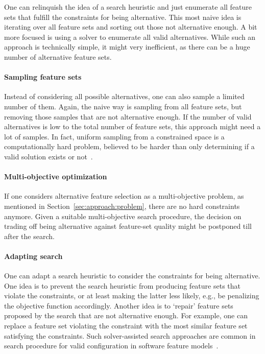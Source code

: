 \documentclass{article}
\theoremstyle{definition}
\begin{document}
One can relinquish the idea of a search heuristic and just enumerate all feature sets that fulfill the constraints for being alternative.
This most naive idea is iterating over all feature sets and sorting out those not alternative enough.
A bit more focused is using a solver to enumerate all valid alternatives.
While such an approach is technically simple, it might very inefficient, as there can be a huge number of alternative feature sets.

\paragraph{Sampling feature sets}

Instead of considering all possible alternatives, one can also sample a limited number of them.
Again, the naive way is sampling from all feature sets, but removing those samples that are not alternative enough.
If the number of valid alternatives is low to the total number of feature sets, this approach might need a lot of samples.
In fact, uniform sampling from a constrained space is a computationally hard problem, believed to be harder than only determining if a valid solution exists or not~\cite{ermon2012uniform}.

\paragraph{Multi-objective optimization}

If one considers alternative feature selection as a multi-objective problem, as mentioned in Section~\ref{sec:approach:problem}, there are no hard constraints anymore.
Given a suitable multi-objective search procedure, the decision on trading off being alternative against feature-set quality might be postponed till after the search.

\paragraph{Adapting search}

One can adapt a search heuristic to consider the constraints for being alternative.
One idea is to prevent the search heuristic from producing feature sets that violate the constraints, or at least making the latter less likely, e.g., be penalizing the objective function accordingly.
Another idea is to `repair' feature sets proposed by the search that are not alternative enough.
For example, one can replace a feature set violating the constraint with the most similar feature set satisfying the constraints.
Such solver-assisted search approaches are common in search procedure for valid configuration in software feature models~\cite{white2010automated,henard2015combining,guo2018preserve}.
\end{document}
